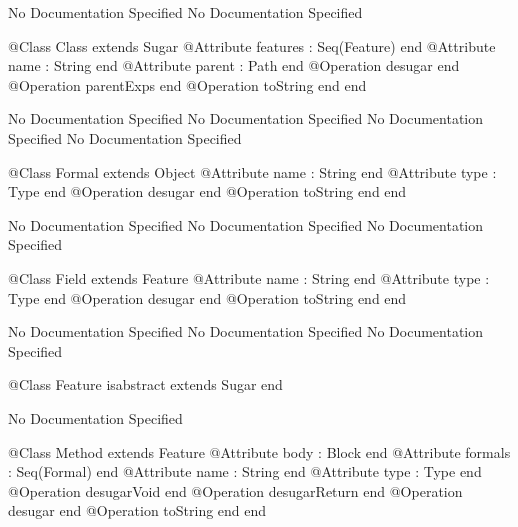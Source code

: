 No Documentation Specified
No Documentation Specified
\begin{Interface}
@Class Class extends Sugar
  @Attribute features : Seq(Feature) end
  @Attribute name : String end
  @Attribute parent : Path end
  @Operation desugar end
  @Operation parentExps end
  @Operation toString end
end
\end{Interface}
No Documentation Specified
No Documentation Specified
No Documentation Specified
No Documentation Specified
\begin{Interface}
@Class Formal extends Object
  @Attribute name : String end
  @Attribute type : Type end
  @Operation desugar end
  @Operation toString end
end
\end{Interface}
No Documentation Specified
No Documentation Specified
No Documentation Specified
\begin{Interface}
@Class Field extends Feature
  @Attribute name : String end
  @Attribute type : Type end
  @Operation desugar end
  @Operation toString end
end
\end{Interface}
No Documentation Specified
No Documentation Specified
No Documentation Specified
\begin{Interface}
@Class Feature isabstract extends Sugar
end
\end{Interface}
No Documentation Specified
\begin{Interface}
@Class Method extends Feature
  @Attribute body : Block end
  @Attribute formals : Seq(Formal) end
  @Attribute name : String end
  @Attribute type : Type end
  @Operation desugarVoid end
  @Operation desugarReturn end
  @Operation desugar end
  @Operation toString end
end
\end{Interface}
